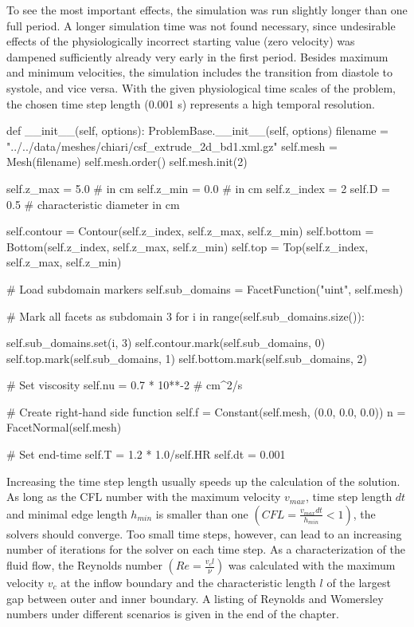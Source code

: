 To see the most important effects, the simulation was run slightly
longer than one full period. A longer simulation time was not found
necessary, since undesirable effects of the physiologically incorrect
starting value (zero velocity) was dampened sufficiently already very
early in the first period. Besides maximum and minimum velocities, the
simulation includes the transition from diastole to systole, and vice
versa.  With the given physiological time scales of the problem, the
chosen time step length (0.001 s) represents a high temporal
resolution.
\begin{python}
def __init__(self, options):
    ProblemBase.__init__(self, options)
    filename = "../../data/meshes/chiari/csf_extrude_2d_bd1.xml.gz"
    self.mesh = Mesh(filename)
    self.mesh.order()
    self.mesh.init(2)

    self.z_max = 5.0	# in cm
    self.z_min = 0.0	# in cm
    self.z_index = 2
    self.D = 0.5 		# characteristic diameter in cm

    self.contour = Contour(self.z_index, self.z_max, self.z_min)
    self.bottom = Bottom(self.z_index, self.z_max, self.z_min)
    self.top = Top(self.z_index, self.z_max, self.z_min)

    # Load subdomain markers
    self.sub_domains = FacetFunction("uint", self.mesh)

    # Mark all facets as subdomain 3
    for i in range(self.sub_domains.size()):

        self.sub_domains.set(i, 3)
        self.contour.mark(self.sub_domains, 0)
        self.top.mark(self.sub_domains, 1)
        self.bottom.mark(self.sub_domains, 2)

        # Set viscosity
        self.nu = 0.7 * 10**-2 # cm^2/s

        # Create right-hand side function
        self.f = Constant(self.mesh, (0.0, 0.0, 0.0))
        n = FacetNormal(self.mesh)

        # Set end-time
        self.T = 1.2 * 1.0/self.HR
        self.dt = 0.001
\end{python}

Increasing the time step length usually speeds up the calculation of
the solution. As long as the CFL number with the maximum velocity
$v_{max}$, time step length $dt$ and minimal edge length $h_{min}$ is
smaller than one $(CFL = \frac{v_{max} dt}{h_{min}} < 1)$, the solvers
should converge. Too small time steps, however, can lead to an
increasing number of iterations for the solver on each time step.  As
a characterization of the fluid flow, the Reynolds number $(Re =
\frac{v_c l}{\nu})$ was calculated with the maximum velocity $v_c$ at
the inflow boundary and the characteristic length $l$ of the largest
gap between outer and inner boundary. A listing of Reynolds and Womersley numbers
under different scenarios is given in the end of the chapter.

